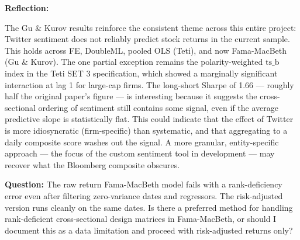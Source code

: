 \documentclass[12pt]{article}
\begin{document}
\bigskip

\noindent\textbf{Reflection:}

The Gu \& Kurov results reinforce the consistent theme across this entire project: Twitter sentiment does not reliably predict stock returns in the current sample. This holds across FE, DoubleML, pooled OLS (Teti), and now Fama-MacBeth (Gu \& Kurov). The one partial exception remains the polarity-weighted $\text{ts\_b}$ index in the Teti SET 3 specification, which showed a marginally significant interaction at lag 1 for large-cap firms. The long-short Sharpe of 1.66 --- roughly half the original paper's figure --- is interesting because it suggests the cross-sectional ordering of sentiment still contains some signal, even if the average predictive slope is statistically flat. This could indicate that the effect of Twitter is more idiosyncratic (firm-specific) than systematic, and that aggregating to a daily composite score washes out the signal. A more granular, entity-specific approach --- the focus of the custom sentiment tool in development --- may recover what the Bloomberg composite obscures.

\bigskip

\noindent\textbf{Question:} The raw return Fama-MacBeth model fails with a rank-deficiency error even after filtering zero-variance dates and regressors. The risk-adjusted version runs cleanly on the same dates. Is there a preferred method for handling rank-deficient cross-sectional design matrices in Fama-MacBeth, or should I document this as a data limitation and proceed with risk-adjusted returns only?
\end{document}
